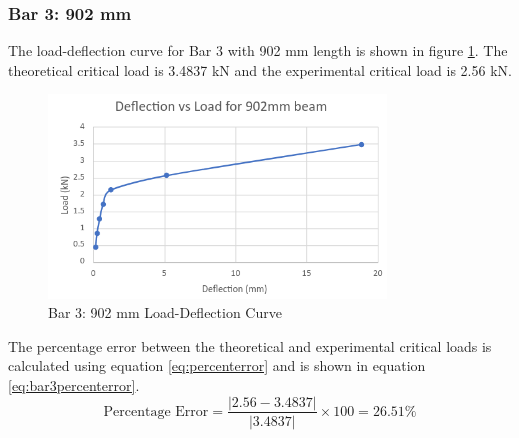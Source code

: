 \documentclass[12pt, titlepage]{article}
\begin{document}
\subsubsection{Bar 3: 902 mm}
The load-deflection curve for Bar 3 with 902 mm length is shown in figure
\ref{fig:bar3loaddefl}. The theoretical critical load is 3.4837 kN and the
experimental critical load is 2.56 kN.
\begin{figure}[H]
    \centering
    \includegraphics[width=0.8\textwidth]{./Images/d902.png}
    \caption{Bar 3: 902 mm Load-Deflection Curve}
    \label{fig:bar3loaddefl}
\end{figure}
The percentage error between the theoretical and experimental critical loads
is calculated using equation \ref{eq:percenterror} and is shown in equation
\ref{eq:bar3percenterror}.
\begin{equation}
    \label{eq:bar3percenterror}
    \text{Percentage Error} = \frac{\left| 2.56 - 3.4837\right|}{\left|3.4837\right|} \times 100 = 26.51\%
\end{equation}
\newpage
\end{document}

